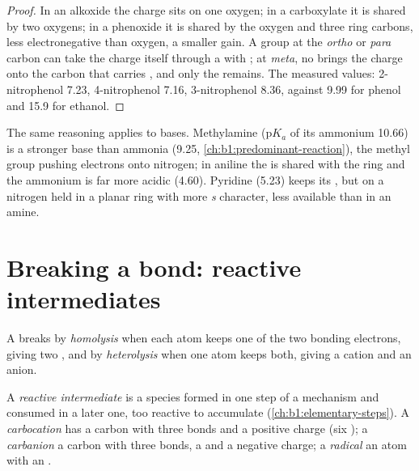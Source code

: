 \begin{proof}
In an alkoxide the charge sits on one oxygen; in a carboxylate it is
shared by two oxygens; in a phenoxide it is shared by the oxygen and three
ring carbons, less electronegative than oxygen, a smaller gain. A
 group at the \textit{ortho} or \textit{para} carbon can take the
charge itself through a  with ; at
\textit{meta}, no  brings the charge onto the carbon
that carries , and only the  remains. The measured
values: 2-nitrophenol 7.23, 4-nitrophenol 7.16, 3-nitrophenol 8.36,
against 9.99 for phenol and 15.9 for ethanol.
\end{proof}

The same reasoning applies to bases. Methylamine ($\mathrm{p}K_a$ of its
ammonium 10.66) is a stronger base than ammonia (9.25, \cref{ch:b1:predominant-reaction}),
the methyl group pushing electrons onto nitrogen; in aniline the 
is shared with the ring and the ammonium is far more acidic (4.60).
Pyridine (5.23) keeps its , but on a nitrogen held in a planar
ring with more \textit{s} character, less available than in an amine.

\section{Breaking a bond: reactive intermediates}

\begin{definition}\label{def:b1:electronic-effects:cleavage}
A  breaks by \emph{homolysis} when each atom
keeps one of the two bonding electrons, giving two , and by
\emph{heterolysis} when one atom keeps both, giving a
cation and an anion.
\end{definition}

\begin{definition}\label{def:b1:electronic-effects:intermediates}
A \emph{reactive intermediate} is a species
formed in one step of a mechanism and consumed in a later one, too
reactive to accumulate (\cref{ch:b1:elementary-steps}). A
\emph{carbocation} has a carbon with three bonds and a
positive charge (six ); a
\emph{carbanion} a carbon with three bonds, a 
and a negative charge; a \emph{radical} an atom with an
.
\end{definition}

